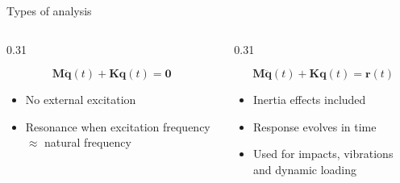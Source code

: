 \documentclass[aspectratio=169]{beamer}
\begin{document}
{{\begin{frame}{Types of analysis}
\begin{columns}[T,onlytextwidth]
        \begin{column}{0.31\textwidth}
          \begin{block}{}
            \centering
            \small
            \[
              \mathbf M\ddot{\mathbf q}(t)
              +
              \mathbf K\mathbf q(t)
              =
              \mathbf 0
            \]
            \vspace{-0.45cm}
            \footnotesize
            \begin{itemize}
              \item No external excitation
              \item Resonance when excitation frequency $\approx$ natural frequency
            \end{itemize}
          \end{block}
        \end{column}

        \begin{column}{0.31\textwidth}

          \begin{block}{}
            \centering
            \small
            \[
              \mathbf M\ddot{\mathbf q}(t)
              +
              \mathbf K\mathbf q(t)
              =
              \mathbf r(t)
            \]
            \vspace{-0.45cm}
            \footnotesize
            \begin{itemize}
              \item Inertia effects included
              \item Response evolves in time
              \item Used for impacts, vibrations and dynamic loading
            \end{itemize}
          \end{block}
        \end{column}
      \end{columns}
    \end{frame}

}}
\end{document}
